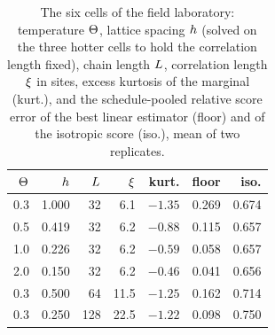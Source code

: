 \begin{table}[t]
\setlength{\tabcolsep}{4pt}
\centering
\small
\caption{The six cells of the field laboratory: temperature $\Theta$, lattice spacing $h$ (solved on the three hotter cells to hold the correlation length fixed), chain length $L$, correlation length $\xi$ in sites, excess kurtosis of the marginal (kurt.), and the schedule-pooled relative score error of the best linear estimator (floor) and of the isotropic score (iso.), mean of two replicates.}
\label{tab:fieldcells}
\begin{tabular}{@{}rrrrrrr@{}}
\toprule
$\Theta$ & $h$ & $L$ & $\xi$ & kurt. & floor & iso. \\
\midrule
0.3 & 1.000 & 32 & 6.1 & $-1.35$ & 0.269 & 0.674 \\
0.5 & 0.419 & 32 & 6.2 & $-0.88$ & 0.115 & 0.657 \\
1.0 & 0.226 & 32 & 6.2 & $-0.59$ & 0.058 & 0.657 \\
2.0 & 0.150 & 32 & 6.2 & $-0.46$ & 0.041 & 0.656 \\
0.3 & 0.500 & 64 & 11.5 & $-1.25$ & 0.162 & 0.714 \\
0.3 & 0.250 & 128 & 22.5 & $-1.22$ & 0.098 & 0.750 \\
\bottomrule
\end{tabular}
\end{table}
